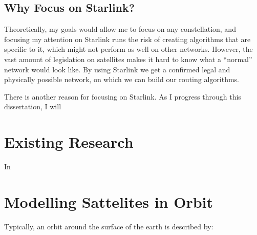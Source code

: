 \documentclass[12pt]{article}
\begin{document}
\subsection{Why Focus on Starlink?}

Theoretically, my goals would allow me to focus on any constellation, and focusing my attention on Starlink runs the risk of creating algorithms that are specific to it, which might not perform as well on other networks. However, the vast amount of legislation on satellites makes it hard to know what a “normal” network would look like. By using Starlink we get a confirmed legal and physically possible network, on which we can build our routing algorithms.

There is another reason for focusing on Starlink. As I progress through this dissertation, I will


\section{Existing Research}

In 

\section{Modelling Sattelites in Orbit}

Typically, an orbit around the surface of the earth is described by:
\end{document}
